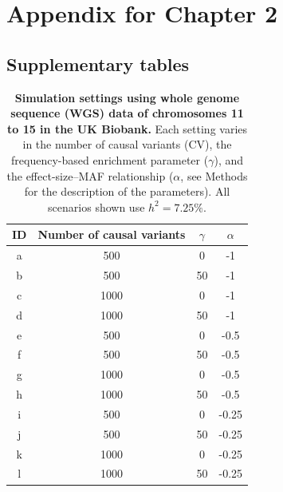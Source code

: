 
\chapter{Appendix for Chapter 2}

\section{Supplementary tables}

\begin{table}[!htp]
\caption[Simulation settings using whole genome sequence (WGS) data of chromosomes 11 to 15 in the UK Biobank]{\textbf{Simulation settings using whole genome sequence (WGS) data of chromosomes 11 to 15 in the UK Biobank.} \small{Each setting varies in the number of causal variants (CV), the frequency-based enrichment parameter ($\gamma$), and the effect-size–MAF relationship ($\alpha$, see Methods for the description of the parameters). All scenarios shown use $h^2 = 7.25\%$.}}
\begin{center}
\begin{tabular}{|| c | c | c | c ||} 
 \hline
ID & Number of causal variants & $\gamma$ & $\alpha$ \\ [0.5ex] 
 \hline\hline
a & 500 & 0 & -1 \\
\hline
b & 500 & 50 & -1 \\
\hline
c & 1000 & 0 & -1 \\
\hline
d & 1000 & 50 & -1 \\
\hline
e & 500 & 0 & -0.5 \\
\hline
f & 500 & 50 & -0.5 \\
\hline
g & 1000 & 0 & -0.5 \\
\hline
h & 1000 & 50 & -0.5 \\
\hline
i & 500 & 0 & -0.25 \\
\hline
j & 500 & 50 & -0.25 \\
\hline
k & 1000 & 0 & -0.25 \\
\hline
l & 1000 & 50 & -0.25 \\
\hline\hline
\end{tabular}
\end{center}
\label{table:S1}
\end{table}


\newpage

